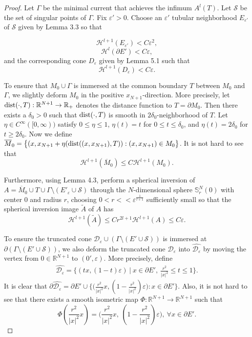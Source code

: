 \documentclass{amsart}
\numberwithin{equation}{section}
\theoremstyle{definition}
\theoremstyle{remark}
\newcommand{\R}{\mathbb{R}}
\begin{document}
\begin{proof} Let $\Gamma$ be the minimal current that achieves the infimum $A^l(T)$. Let $\mathcal{S}$ be the set of singular points of $\Gamma$.
Fix $\varepsilon'>0$. Choose an $\varepsilon'$ tubular neighborhood $E_{\varepsilon'}$ of $\mathcal{S}$ given by Lemma 3.3 so that

\[\mathcal{H}^{l+1}(E_{\varepsilon'})<C \varepsilon^2,\]  
\[\mathcal{H}^{l}(\partial E')<C \varepsilon,\]
and the corresponding cone $D_\varepsilon$ given by Lemma 5.1 such that \[\mathcal{H}^{l+1}(D_\varepsilon)<C\varepsilon.\]

{To ensure that $M_0\cup \Gamma$ is immersed at the common boundary $T$ between $M_0$ and $\Gamma$, we slightly deform $M_0$ in the positive $x_{N+1}$-direction.
More precisely, let ${\rm{dist}}(\cdot, T):\R^{N+1}\to\R_+$ denotes the distance function to $T=\partial M_0$. Then there exists a $\delta_0>0$ such that 
${\rm{dist}}(\cdot, T)$ is smooth in $2\delta_0$-neighborhood
of $T$. Let $\eta\in C^\infty([0,\infty))$ satisfy $0\le\eta\le 1$, $\eta(t)=t$ for $0\le t\le \delta_0$, and $\eta(t)=2\delta_0$ for $t\ge 2\delta_0$.  Now we define
$\overline{M}_0=\big\{(x, x_{N+1}+\eta({\rm{dist}}((x, x_{N+1}),T)): (x, x_{N+1})\in M_0\big\}$. It is not hard to see that 
$$\mathcal{H}^{l+1}(\overline{M}_0)\le C\mathcal{H}^{l+1}(M_0).$$}

Furthermore, using Lemma 4.3, perform a spherical inversion of $A = \overline{M}_0 \cup T\cup \Gamma \setminus (E'_\varepsilon \cup \mathcal{S})$ through 
{the $N$-dimensional sphere $\mathbb{S}^N_r(0)$ with center $0$ and radius $r$}, choosing {$0<r<< \varepsilon^{\frac{1}{l+1}}$ 
sufficiently small  so that }the spherical inversion image $\widetilde{A}$ of $A$
has 
\[\mathcal{H}^{l+1}(\widetilde{A})\le C r^{2l+1} \mathcal{H}^{l+1}(A)\le C \varepsilon.\]

\smallskip
{To ensure the truncated cone $\mathcal{D}_\varepsilon \cup (\Gamma\setminus(E'\cup\mathcal{S}))$ is immersed at $\partial(\Gamma\setminus(E'\cup\mathcal{S}))$,
we also deform the truncated cone $\mathcal{D}_\varepsilon$ into $\widehat{\mathcal{D}_\varepsilon}$ 
by moving the vertex from $0\in\R^{N+1}$ to $(0',\varepsilon)$. More precisely, define 
\begin{align*}
\widehat{\mathcal{D}_\varepsilon}=\Big\{(tx, (1-t)\varepsilon)\ \big|\ x\in \partial E', \ \frac{r^2}{|x|^2} \le t\le 1\Big\}.
\end{align*}
It is clear that $\partial \widehat{\mathcal{D}_\varepsilon}=\partial E'\cup \big\{\big(\frac{r^2}{|x|^2} x, (1-\frac{r^2}{|x|^2})\varepsilon\big): x\in\partial E'\big\}$.
Also, it is not hard to see that there exists a smooth isometric map $\Phi:\mathbb R^{N+1}\to \mathbb R^{N+1}$ such that 
$$\Phi(\frac{r^2}{|x|^2} x)= \Big(\frac{r^2}{|x|^2} x, \ (1-\frac{r^2}{|x|^2})\varepsilon\Big), \ \forall x\in \partial E'.$$

}
\end{proof}
\end{document}
